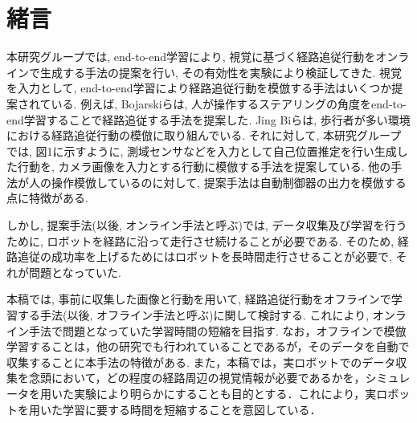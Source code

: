 \documentclass{ujarticle}
\begin{document}
\small
\section{緒言}%
本研究グループでは, end-to-end学習により, 視覚に基づく経路追従行動をオンラインで生成する手法の提案を行い, その有効性を実験により検証してきた\cite{si2020-okada}\cite{si2021-okada}. 視覚を入力として, end-to-end学習により経路追従行動を模倣する手法はいくつか提案されている. 例えば, Bojarskiらは, 人が操作するステアリングの角度をend-to-end学習することで経路追従する手法を提案した\cite{bojarski}. Jing Biらは, 歩行者が多い環境における経路追従行動の模倣に取り組んでいる\cite{pedestrian}. それに対して, 本研究グループでは, 図1に示すように, 測域センサなどを入力として自己位置推定を行い生成した行動を, カメラ画像を入力とする行動に模倣する手法を提案している. 他の手法が人の操作模倣しているのに対して, 提案手法は自動制御器の出力を模倣する点に特徴がある. \par しかし, 提案手法(以後, オンライン手法と呼ぶ)では, データ収集及び学習を行うために, ロボットを経路に沿って走行させ続けることが必要である. そのため, 経路追従の成功率を上げるためにはロボットを長時間走行させることが必要で, それが問題となっていた. \par 本稿では, 事前に収集した画像と行動を用いて, 経路追従行動をオフラインで学習する手法(以後, オフライン手法と呼ぶ)に関して検討する. これにより, オンライン手法で問題となっていた学習時間の短縮を目指す. なお，オフラインで模倣学習することは，他の研究でも行われていることであるが，そのデータを自動で収集することに本手法の特徴がある. また，本稿では，実ロボットでのデータ収集を念頭において，どの程度の経路周辺の視覚情報が必要であるかを，シミュレータを用いた実験により明らかにすることも目的とする．これにより，実ロボットを用いた学習に要する時間を短縮することを意図している．

\end{document}
